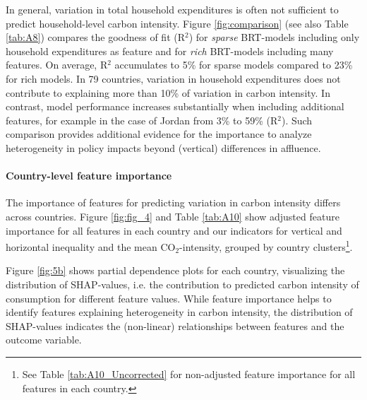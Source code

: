 \documentclass[12pt, a4paper]{article}
\begin{document}
In general, variation in total household expenditures is often not sufficient to predict household-level carbon intensity. Figure \ref{fig:comparison} (see also Table \ref{tab:A8}) compares the goodness of fit (R$^{2}$) for \textit{sparse} BRT-models including only household expenditures as feature and for \textit{rich} BRT-models including many features. On average, R$^{2}$ accumulates to 5\% for sparse models compared to 23\% for rich models. In 79 countries, variation in household expenditures does not contribute to explaining more than 10\% of variation in carbon intensity. In contrast, model performance increases substantially when including additional features, for example in the case of Jordan from 3\% to 59\% (R$^{2}$). Such comparison provides additional evidence for the importance to analyze heterogeneity in policy impacts beyond (vertical) differences in affluence.  

\paragraph{Country-level feature importance}
The importance of features for predicting variation in carbon intensity differs across countries. Figure \ref{fig:fig_4} and Table \ref{tab:A10} show adjusted feature importance for all features in each country and our indicators for vertical and horizontal inequality and the mean CO$_{2}$-intensity, grouped by country clusters\footnote{See Table \ref{tab:A10_Uncorrected} for non-adjusted feature importance for all features in each country.}. 

Figure \ref{fig:5b} shows partial dependence plots for each country, visualizing the distribution of SHAP-values, i.e. the contribution to predicted carbon intensity of consumption for different feature values. While feature importance helps to identify features explaining heterogeneity in carbon intensity, the distribution of SHAP-values indicates the (non-linear) relationships between features and the outcome variable.
\end{document}
